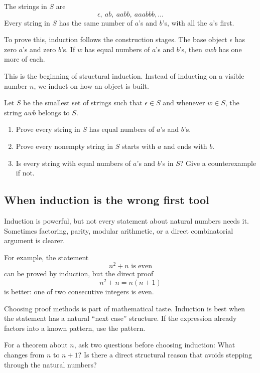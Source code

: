 The strings in $S$ are
\[
\epsilon,\ ab,\ aabb,\ aaabbb,\ldots
\]
Every string in $S$ has the same number of $a$'s and $b$'s, with all the $a$'s first.

To prove this, induction follows the construction stages. The base object $\epsilon$ has zero $a$'s and zero $b$'s. If $w$ has equal numbers of $a$'s and $b$'s, then $awb$ has one more of each.

This is the beginning of structural induction. Instead of inducting on a visible number $n$, we induct on how an object is built.

\begin{labbox}
Let $S$ be the smallest set of strings such that $\epsilon\in S$ and whenever $w\in S$, the string $awb$ belongs to $S$.
\begin{enumerate}
\item Prove every string in $S$ has equal numbers of $a$'s and $b$'s.
\item Prove every nonempty string in $S$ starts with $a$ and ends with $b$.
\item Is every string with equal numbers of $a$'s and $b$'s in $S$? Give a counterexample if not.
\end{enumerate}
\end{labbox}

\subsection{When induction is the wrong first tool}

Induction is powerful, but not every statement about natural numbers needs it. Sometimes factoring, parity, modular arithmetic, or a direct combinatorial argument is clearer.

For example, the statement
\[
n^2+n\text{ is even}
\]
can be proved by induction, but the direct proof
\[
n^2+n=n(n+1)
\]
is better: one of two consecutive integers is even.

Choosing proof methods is part of mathematical taste. Induction is best when the statement has a natural ``next case'' structure. If the expression already factors into a known pattern, use the pattern.

\begin{walkbox}
For a theorem about $n$, ask two questions before choosing induction: What changes from $n$ to $n+1$? Is there a direct structural reason that avoids stepping through the natural numbers?
\end{walkbox}

